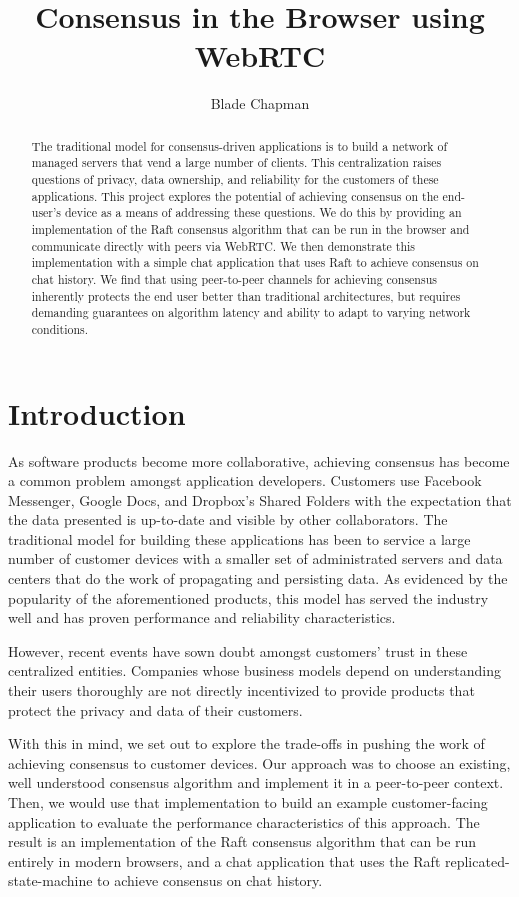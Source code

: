 \documentclass[11pt,twocolumn]{article}
\title{Consensus in the Browser using WebRTC}
\author{Blade Chapman}
\date{}
\begin{document}
\maketitle

\begin{abstract}
The traditional model for consensus-driven applications is to build a network of managed servers that vend a large number of clients. This centralization raises questions of privacy, data ownership, and reliability for the customers of these applications. This project explores the potential of achieving consensus on the end-user’s device as a means of addressing these questions. We do this by providing an implementation of the Raft consensus algorithm that can be run in the browser and communicate directly with peers via WebRTC. We then demonstrate this implementation with a simple chat application that uses Raft to achieve consensus on chat history. We find that using peer-to-peer channels for achieving consensus inherently protects the end user better than traditional architectures, but requires demanding guarantees on algorithm latency and ability to adapt to varying network conditions.\\
\end{abstract}

\section{Introduction}
As software products become more collaborative, achieving consensus has become a common problem amongst application developers. Customers use Facebook Messenger, Google Docs, and Dropbox's Shared Folders with the expectation that the data presented is up-to-date and visible by other collaborators. The traditional model for building these applications has been to service a large number of customer devices with a smaller set of administrated servers and data centers that do the work of propagating and persisting data. As evidenced by the popularity of the aforementioned products, this model has served the industry well and has proven performance and reliability characteristics.

However, recent events have sown doubt amongst customers' trust in these centralized entities. Companies whose business models depend on understanding their users thoroughly are not directly incentivized to provide products that protect the privacy and data of their customers.

With this in mind, we set out to explore the trade-offs in pushing the work of achieving consensus to customer devices. Our approach was to choose an existing, well understood consensus algorithm and implement it in a peer-to-peer context. Then, we would use that implementation to build an example customer-facing application to evaluate the performance characteristics of this approach. The result is an implementation of the Raft consensus algorithm that can be run entirely in modern browsers, and a chat application that uses the Raft replicated-state-machine to achieve consensus on chat history.
\end{document}
